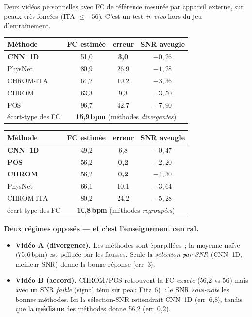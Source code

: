 \documentclass[11pt,a4paper]{article}
\newcommand{\ok}[1]{\textcolor{good}{#1}}
\newcommand{\ko}[1]{\textcolor{bad}{#1}}
\begin{document}
Deux vidéos personnelles avec FC de référence mesurée par appareil externe, sur
peaux très foncées (ITA $\le -56$). C'est un test \emph{in vivo} hors du jeu
d'entraînement.

\begin{center}
\begin{tabular}{@{}lccc@{}}
\toprule
Méthode & FC estimée & erreur & SNR aveugle \\
\midrule
\textbf{CNN~1D}    & 51,0 & \ok{\textbf{3,0}} & \ok{$-0{,}26$} \\
PhysNet            & 80,9 & 26,9 & $-1{,}28$ \\
CHROM-ITA          & 64,2 & 10,2 & $-3{,}36$ \\
CHROM              & 63,3 & 9,3  & $-3{,}50$ \\
POS                & 96,7 & 42,7 & $-7{,}90$ \\
\midrule
écart-type des FC & \multicolumn{3}{c}{\textbf{15,9\,bpm} (méthodes \emph{divergentes})} \\
\bottomrule
\end{tabular}
\end{center}

\begin{center}
\begin{tabular}{@{}lccc@{}}
\toprule
Méthode & FC estimée & erreur & SNR aveugle \\
\midrule
\textbf{CNN~1D}    & 49,2 & 6,8 & \ok{$-0{,}47$} \\
\textbf{POS}       & 56,2 & \ok{\textbf{0,2}} & $-2{,}20$ \\
\textbf{CHROM}     & 56,2 & \ok{\textbf{0,2}} & $-4{,}30$ \\
PhysNet            & 66,1 & 10,1 & $-3{,}64$ \\
CHROM-ITA          & 80,2 & 24,2 & \ko{$-5{,}28$} \\
\midrule
écart-type des FC & \multicolumn{3}{c}{\textbf{10,8\,bpm} (méthodes \emph{regroupées})} \\
\bottomrule
\end{tabular}
\end{center}

\noindent\textbf{Deux régimes opposés --- et c'est l'enseignement central.}
\begin{itemize}[leftmargin=1.4em]
\item \textbf{Vidéo A (divergence).} Les méthodes sont éparpillées~; la moyenne
naïve (75,6\,bpm) est polluée par les fausses. Seule la \emph{sélection par SNR}
(CNN~1D, meilleur SNR) donne la bonne réponse (err~3).
\item \textbf{Vidéo B (accord).} CHROM/POS retrouvent la FC \emph{exacte}
(56,2 vs 56) mais avec un SNR \emph{faible} (signal ténu sur peau Fitz~6)~: le SNR
\emph{sous-note} les bonnes méthodes. Ici la sélection-SNR retiendrait CNN~1D
(err~6,8), tandis que la \textbf{médiane} des méthodes donne 56,2 (err~0,2).
\end{itemize}
\end{document}
